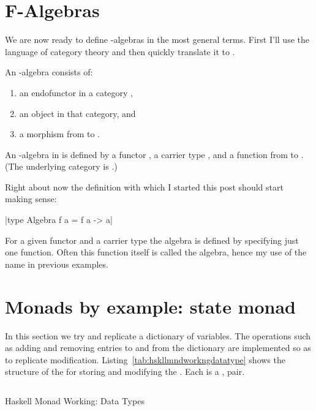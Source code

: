\documentclass[proposal.tex]{subfiles}
\begin{document}
\section{F-Algebras}


We are now ready to define -algebras in the most general terms.
First I'll use the language of category theory and then quickly translate it to .

An -algebra consists of:
\begin{enumerate}
\item an endofunctor  in a category ,
\item an object  in that category, and
\item a morphism from  to .
\end{enumerate}

An -algebra in  is defined by a functor , a carrier type , and a function from  to . (The underlying category is .)

Right about now the definition with which I started this post should start making sense:

|type Algebra f a = f a -> a|

For a given functor  and a carrier type  the algebra is defined by specifying just one function.
Often this function itself is called the algebra, hence my use of the name  in previous examples.


\section{Monads by example: state monad}

In this section we try and replicate a dictionary of variables. The operations such as adding and removing entries to and from the
dictionary are implemented so as to replicate modification. Listing~\ref{tab:hskllmndworkngdatatype} shows the structure of the 
 for storing and modifying the . Each  is a ,  pair.
 
\begin{code-list}[H]
  \begin{singlespace}
    \inputminted[linenos, firstline=22, lastline=33]{haskell}{haskell-monad-working-2.hs}
  \end{singlespace}
  \caption{Haskell Monad Working: Data Types}
\label{tab:hskllmndworkngdatatype}
\end{code-list}
\end{document}
